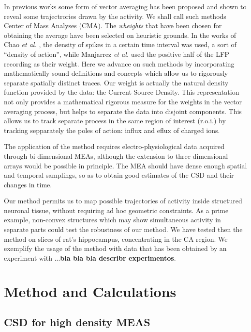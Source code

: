 \documentclass{article}
\begin{document}
In previous works some form of vector averaging has been proposed and shown to reveal some trajectrories drawn by the activity. We shall call such methods Center of Mass Analyses (CMA).  The \emph{wheights} that have been chosen for obtaining the average have been selected on heuristic grounds. In the works of Chao \emph{et al.} \cite{Chao05, Chao07}, the density of spikes in a certain time interval was used, a sort of ``density of action'', while Manjarrez \emph{et al.} \cite{Manjarrez07, Manjarrez09} used the positive half of the LFP recording as their weight. 
Here we advance on such methods by incorporating mathematically sound definitions and concepts which allow us to rigorously separate spatially distinct traces. Our weight is actually the natural density function provided by the data: the Current Source Density. This representation not only provides a mathematical rigorous  measure for the weights in the vector averaging process, but helps to separate the data into disjoint components. This allows us to track separate process in the same region of interest (r.o.i.) by tracking sepparately the poles of action: influx and eflux of charged ions. 

The application of the method requires electro-physiological data acquired through bi-dimensional MEAs, although the extension to three dimensional arrays would be possible in principle. The MEA should have dense enough spatial and temporal samplings, so as to obtain good estimates of the CSD and their changes in time.

Our method permits us to map possible trajectories of activity inside structured neuronal tissue, without requiring ad hoc geometric constraints. As a prime example, non-convex structures which may show simultaneous activity in separate parts could test the robustness of our method. We have tested then the method on slices of rat's hippocampus, concentrating in the CA region. We exemplify the usage of the method with data that has been obtained by an experiment with ...\textbf{bla bla bla describr experimentos}.




\section{Method and Calculations}


\subsection{CSD for high density MEAS}
\end{document}
